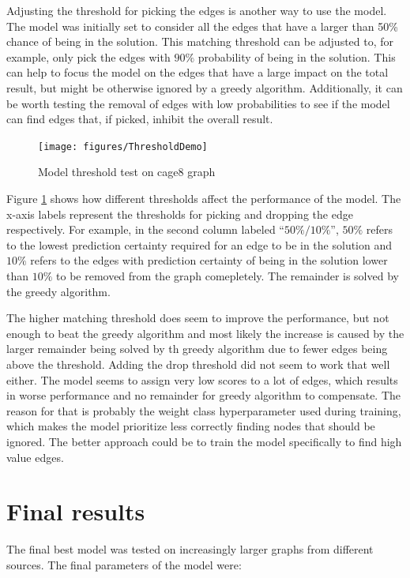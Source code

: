 Adjusting the threshold for picking the edges is another way to use the model. The model was initially set to consider all the edges that have a larger than 50\% chance of being in the solution. This matching threshold can be adjusted to, for example, only pick the edges with $90\%$ probability of being in the solution. This can help to focus the model on the edges that have a large impact on the total result, but might be otherwise ignored by a greedy algorithm. Additionally, it can be worth testing the removal of edges with low probabilities to see if the model can find edges that, if picked, inhibit the overall result.

\begin{figure}[H]
    \centering
    \hspace*{-1cm}
    \texttt{[image: figures/ThresholdDemo]}
    \caption{Model threshold test on cage8 graph}
    \label{Model threshold test}
\end{figure}

Figure \ref{Model threshold test} shows how different thresholds affect the performance of the model. The x-axis labels represent the thresholds for picking and dropping the edge respectively. For example, in the second column labeled “$50\% / 10\%$”, $50\%$ refers to the lowest prediction certainty required for an edge to be in the solution and $10\%$ refers to the edges with prediction certainty of being in the solution lower than $10\%$ to be removed from the graph comepletely. The remainder is solved by the greedy algorithm.

The higher matching threshold does seem to improve the performance, but not enough to beat the greedy algorithm and most likely the increase is caused by the larger remainder being solved by th greedy algorithm due to fewer edges being above the threshold. Adding the drop threshold did not seem to work that well either. The model seems to assign very low scores to a lot of edges, which results in worse performance and no remainder for greedy algorithm to compensate. The reason for that is probably the weight class hyperparameter used during training, which makes the model prioritize less correctly finding nodes that should be ignored. The better approach could be to train the model specifically to find high value edges.

\section{Final results}

The final best model was tested on increasingly larger graphs from different sources. The final parameters of the model were:

